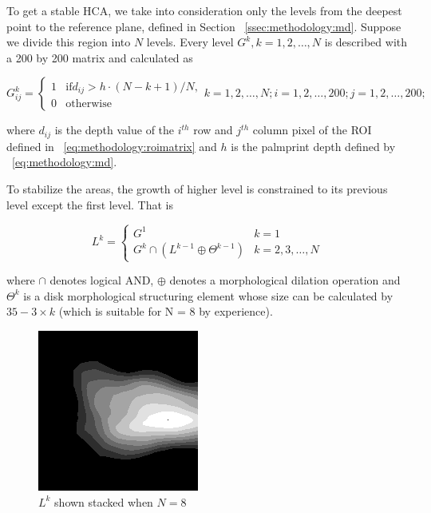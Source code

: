 To get a stable HCA, we take into consideration only the levels from the deepest point to the reference plane, defined in Section ~\ref{ssec:methodology:md}. Suppose we divide this region into $N$ levels. Every level $G^k, k=1,2,\dots,N$ is described with a 200 by 200 matrix and calculated as

\begin{equation}
G^k_{ij} =
\begin{cases}
1 & \text{if} d_{ij}>h\cdot(N-k+1)/N,\\
0 & \text{otherwise}
\end{cases}
k=1,2,\dots,N;i=1,2,\dots,200;j=1,2,\dots,200;
\end{equation}

where $d_{ij}$ is the depth value of the $i^{th}$ row and $j^{th}$ column pixel of the ROI defined in ~\ref{eq:methodology:roimatrix} and $h$ is the palmprint depth defined by ~\ref{eq:methodology:md}.

To stabilize the areas, the growth of higher level is constrained to its previous level except the first level. That is

\begin{equation}
L^k=
\begin{cases}
G^1                             & k=1 \\
G^k \cap (L^{k-1} \oplus \Theta^{k-1}) & k=2,3,\dots,N
\end{cases}
\end{equation}

where $\cap$ denotes logical AND, $\oplus$ denotes a morphological dilation operation and  $\Theta^{k}$ is a disk morphological structuring element whose size can be calculated by $35-3 \times k$ (which is suitable for N = 8 by experience).

\begin{figure}[htb]
\begin{center}
\includegraphics[width=0.9\linewidth]{ch-methodology/figures/hcastack}
\caption[$L^k$ shown stacked when $N=8$]{$L^k$ shown stacked when $N=8$}
\label{fig:methodology:hcastack}
\end{center}
\end{figure}

